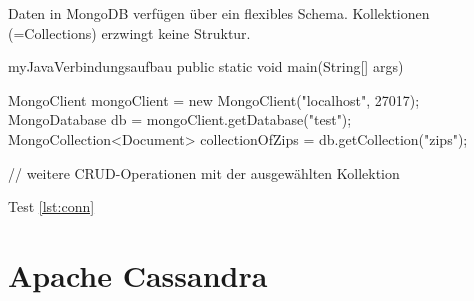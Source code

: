 Daten in MongoDB verfügen über ein flexibles Schema. Kollektionen (=Collections) erzwingt keine Struktur.

\begin{listingsbox}[label={lst:conn}]{myJava}{Verbindungsaufbau}
public static void main(String[] args) {

	MongoClient mongoClient = new MongoClient("localhost", 27017);
        MongoDatabase db = mongoClient.getDatabase("test");
        MongoCollection<Document> collectionOfZips = db.getCollection("zips");
        
        // weitere CRUD-Operationen mit der ausgewählten Kollektion
}
\end{listingsbox}
Test \ref{lst:conn}
\section{Apache Cassandra}